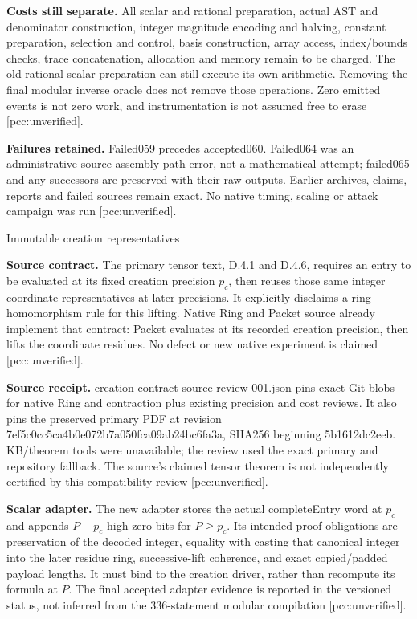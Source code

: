 \documentclass[10pt]{article}
\begin{document}
\textbf{Costs still separate.} All scalar and rational preparation, actual
AST and denominator construction, integer magnitude encoding and halving,
constant preparation, selection and control, basis construction, array access,
index/bounds checks, trace concatenation, allocation and memory remain to be
charged. The old rational scalar preparation can still execute its own
arithmetic. Removing the final modular inverse oracle does not remove those
operations. Zero emitted events is not zero work, and instrumentation is not
assumed free to erase [pcc:unverified].

\textbf{Failures retained.} Failed059 precedes accepted060. Failed064 was an
administrative source-assembly path error, not a mathematical attempt;
failed065 and any successors are preserved with their raw outputs. Earlier
archives, claims, reports and failed sources remain exact. No native timing,
scaling or attack campaign was run [pcc:unverified].
\newpage
\begin{center}{\Large Immutable creation representatives}\end{center}
\textbf{Source contract.} The primary tensor text, D.4.1 and D.4.6, requires
an entry to be evaluated at its fixed creation precision $p_c$, then reuses
those same integer coordinate representatives at later precisions. It
explicitly disclaims a ring-homomorphism rule for this lifting. Native Ring
and Packet source already implement that contract: Packet evaluates at its
recorded creation precision, then lifts the coordinate residues. No defect
or new native experiment is claimed [pcc:unverified].

\textbf{Source receipt.} creation-contract-source-review-001.json pins exact
Git blobs for native Ring and contraction plus existing precision and cost
reviews. It also pins the preserved primary PDF at revision
7ef5c0cc5ca4b0e072b7a050fca09ab24bc6fa3a, SHA256 beginning
5b1612dc2eeb. KB/theorem tools were unavailable; the review used the exact
primary and repository fallback. The source's claimed tensor theorem is not
independently certified by this compatibility review [pcc:unverified].

\textbf{Scalar adapter.} The new adapter stores the actual completeEntry
word at $p_c$ and appends $P-p_c$ high zero bits for $P\ge p_c$. Its intended
proof obligations are preservation of the decoded integer, equality with
casting that canonical integer into the later residue ring, successive-lift
coherence, and exact copied/padded payload lengths. It must bind to the
creation driver, rather than recompute its formula at $P$. The final accepted
adapter evidence is reported in the versioned status, not inferred from the
336-statement modular compilation [pcc:unverified].
\end{document}
